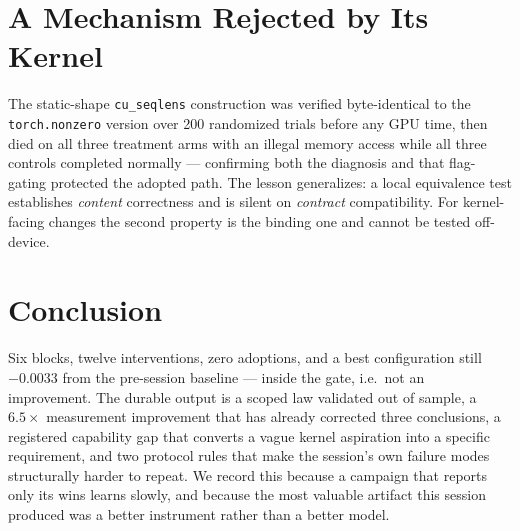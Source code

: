 \documentclass{article}
\begin{document}
\section{A Mechanism Rejected by Its Kernel}
The static-shape \texttt{cu\_seqlens} construction was verified byte-identical to the \texttt{torch.nonzero} version over 200 randomized trials before any GPU time, then died on all three treatment arms with an illegal memory access while all three controls completed normally --- confirming both the diagnosis and that flag-gating protected the adopted path. The lesson generalizes: a local equivalence test establishes \emph{content} correctness and is silent on \emph{contract} compatibility. For kernel-facing changes the second property is the binding one and cannot be tested off-device.

\section{Conclusion}
Six blocks, twelve interventions, zero adoptions, and a best configuration still $-0.0033$ from the pre-session baseline --- inside the gate, i.e.\ not an improvement. The durable output is a scoped law validated out of sample, a $6.5\times$ measurement improvement that has already corrected three conclusions, a registered capability gap that converts a vague kernel aspiration into a specific requirement, and two protocol rules that make the session's own failure modes structurally harder to repeat. We record this because a campaign that reports only its wins learns slowly, and because the most valuable artifact this session produced was a better instrument rather than a better model.
\end{document}
